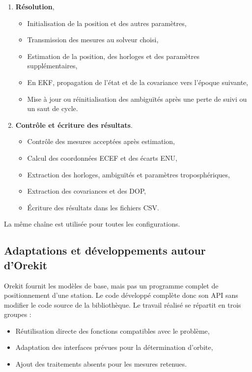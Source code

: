 \begin{enumerate}
    \item \textbf{Résolution},
    \begin{itemize}
        \item Initialisation de la position et des autres paramètres,
        \item Transmission des mesures au solveur choisi,
        \item Estimation de la position, des horloges et des paramètres
        supplémentaires,
        \item En EKF, propagation de l'état et de la covariance vers l'époque
        suivante,
        \item Mise à jour ou réinitialisation des ambiguïtés après une perte de
        suivi ou un saut de cycle.
    \end{itemize}

    \item \textbf{Contrôle et écriture des résultats}.
    \begin{itemize}
        \item Contrôle des mesures acceptées après estimation,
        \item Calcul des coordonnées ECEF et des écarts ENU,
        \item Extraction des horloges, ambiguïtés et paramètres
        troposphériques,
        \item Extraction des covariances et des DOP,
        \item Écriture des résultats dans les fichiers CSV.
    \end{itemize}
\end{enumerate}

La même chaîne est utilisée pour toutes les configurations.

\subsection{Adaptations et développements autour d'Orekit}
\label{sec:implementation_adaptations}

Orekit fournit les modèles de base, mais pas un programme complet de
positionnement d'une station. Le code développé complète donc son API sans
modifier le code source de la bibliothèque. Le travail réalisé se répartit en
trois groupes :

\begin{itemize}
    \item Réutilisation directe des fonctions compatibles avec le problème,
    \item Adaptation des interfaces prévues pour la détermination d'orbite,
    \item Ajout des traitements absents pour les mesures retenues.
\end{itemize}

